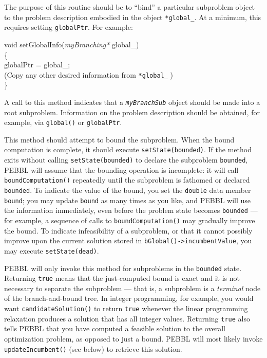 The purpose of this routine should be to ``bind'' a particular
subproblem object to the problem description embodied in the object
\texttt{*global\_}.  At a minimum, this requires setting
\texttt{globalPtr}.  For example:
\begin{codeblock}
voi\=d setGlobalInfo(\emph{myBranching*} global\_) \\
\{ \\
\> globalPtr = global\_; \\
\>\textrm{(Copy any other desired information from
  \texttt{*global\_} )}\\
\}
\end{codeblock}


A call to this method indicates that a \texttt{\emph{myBranchSub}}
object should be made into a root subproblem.  Information on the
problem description should be obtained, for example, via
\texttt{global()} or \texttt{globalPtr}.

\pagebreak[1]

This method should attempt to bound the subproblem.  When the bound
computation is complete, it should execute \texttt{setState(bounded)}.
If the method exits without calling \texttt{setState(bounded)} to
declare the subproblem \texttt{bounded}, PEBBL will assume that the
bounding operation is incomplete: it will call
\texttt{boundComputation()} repeatedly until the subproblem is
fathomed or declared \texttt{bounded}.  To indicate the value of the
bound, you set the \texttt{double} data member \texttt{bound};
you may update \texttt{bound} as many times as you like, and PEBBL
will use the information immediately, even before the
problem state becomes \texttt{bounded} --- for example, a sequence of calls
to \texttt{boundComputation()} may gradually improve the bound.
To indicate infeasibility of a subproblem, or that it cannot possibly
improve upon the current solution stored in
\texttt{bGlobal()->incumbentValue}, you may execute
\texttt{setState(dead)}. 


PEBBL will only invoke this method
for subproblems in the \texttt{bounded} state.  Returning
\texttt{true} means that the just-computed bound is
exact and it is not necessary to separate the subproblem --- that is,
a subproblem is a \emph{terminal} node of the branch-and-bound
tree.  In integer programming, for example, you would want
\texttt{candidateSolution()} to return \texttt{true} whenever the
linear programming relaxation produces a solution that has all integer
values.  Returning \texttt{true} also tells PEBBL that you have
computed a feasible solution to the overall optimization problem, as
opposed to just a bound.  PEBBL will most likely invoke
\texttt{updateIncumbent()} (see below) to retrieve this solution.


